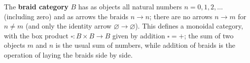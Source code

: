 The \textbf{braid category} $B$ has as objects all natural numbers $n = 0, 1, 2, \ldots$ (including zero) and as arrows the braids $n \to n$; there are no arrows $n \to m$ for $n \neq m$ (and only the identity arrow $\varnothing \to \varnothing$). This defines a monoidal category, with the box product $\square : B \times B \to B$ given by addition $\square = +$; the sum of two objects $m$ and $n$ is the usual sum of numbers, while addition of braids is the operation of laying the braids side by side.
